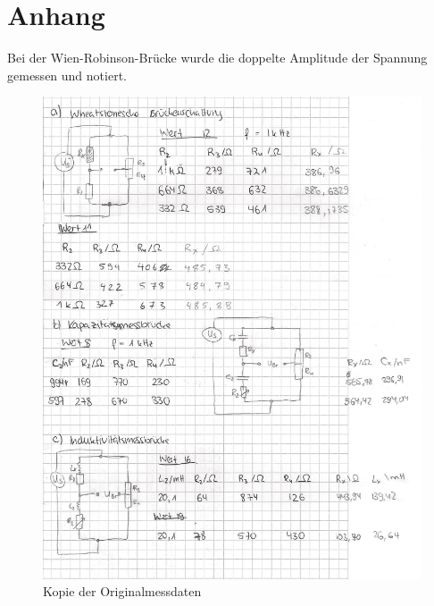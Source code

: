\section{Anhang}
Bei der Wien-Robinson-Brücke wurde die doppelte Amplitude der Spannung gemessen und notiert.
\begin{figure}
    \centering
    \caption{Kopie der Originalmessdaten}
    \includegraphics[width=\textwidth]{messdaten1.pdf}
\end{figure}
